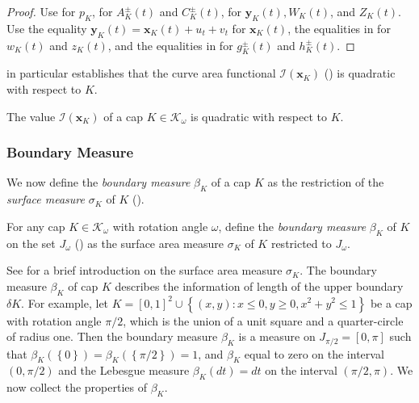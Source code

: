 \begin{proof}
Use  for \(p_K\),  for \(A^{\pm}_K(t)\) and \(C^{\pm}_K(t)\),  for \(\mathbf{y}_K(t), W_K(t)\), and \(Z_K(t)\). Use the equality \(\mathbf{y}_K(t) = \mathbf{x}_K(t) + u_t + v_t\) for \(\mathbf{x}_K(t)\), the equalities in  for \(w_K(t)\) and \(z_K(t)\), and the equalities in  for \(g^{\pm}_K(t)\) and \(h^{\pm}_K(t)\).
\end{proof}

 in particular establishes that the curve area functional \(\mathcal{I}(\mathbf{x}_K)\) () is quadratic with respect to \(K\).

\begin{corollary}

The value \(\mathcal{I}(\mathbf{x}_K)\) of a cap \(K \in \mathcal{K}_\omega\) is quadratic with respect to \(K\).

\label{cor:inner-corner-quadratic}
\end{corollary}

\subsubsection{Boundary Measure}

We now define the \emph{boundary measure} \(\beta_K\) of a cap \(K\) as the restriction of the \emph{surface measure} \(\sigma_K\) of \(K\) ().

\begin{definition}

For any cap \(K \in \mathcal{K}_\omega\) with rotation angle \(\omega\), define the \emph{boundary measure} \(\beta_K\) of \(K\) on the set \(J_\omega\) () as the surface area measure \(\sigma_K\) of \(K\) restricted to \(J_\omega\).

\label{def:boundary-measure}
\end{definition}

See  for a brief introduction on the surface area measure \(\sigma_K\). The boundary measure \(\beta_K\) of cap \(K\) describes the information of length of the upper boundary \(\delta K\). For example, let \(K = [0, 1]^2 \cup \left\{ (x, y) : x \leq 0, y \geq 0, x^2 + y^2 \leq 1 \right\}\) be a cap with rotation angle \(\pi/2\), which is the union of a unit square and a quarter-circle of radius one. Then the boundary measure \(\beta_K\) is a measure on \(J_{\pi/2} = [0, \pi]\) such that \(\beta_K\left( \left\{ 0 \right\} \right) = \beta_K\left( \left\{ \pi/2 \right\} \right) = 1\), and \(\beta_K\) equal to zero on the interval \((0, \pi/2)\) and the Lebesgue measure \(\beta_K(dt) = dt\) on the interval \((\pi/2, \pi)\). We now collect the properties of \(\beta_K\).

